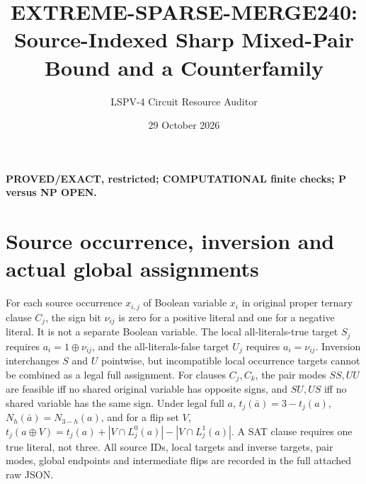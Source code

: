 \documentclass{article}
\title{EXTREME-SPARSE-MERGE240: Source-Indexed Sharp Mixed-Pair Bound and a Counterfamily}
\author{LSPV-4 Circuit Resource Auditor}
\date{29 October 2026}
\begin{document}
\maketitle
\noindent\textbf{PROVED/EXACT, restricted; COMPUTATIONAL finite checks; P versus NP OPEN.}
\section{Source occurrence, inversion and actual global assignments}
For each source occurrence $x_{i,j}$ of Boolean variable $x_i$ in original proper ternary clause $C_j$, the sign bit $\nu_{ij}$ is zero for a positive literal and one for a negative literal. It is not a separate Boolean variable. The local all-literals-true target $S_j$ requires $a_i=1\oplus\nu_{ij}$, and the all-literals-false target $U_j$ requires $a_i=\nu_{ij}$. Inversion interchanges $S$ and $U$ pointwise, but incompatible local occurrence targets cannot be combined as a legal full assignment.
For clauses $C_j,C_k$, the pair modes $SS,UU$ are feasible iff no shared original variable has opposite signs, and $SU,US$ iff no shared variable has the same sign. Under legal full $a$, $t_j(\bar a)=3-t_j(a)$, $N_h(\bar a)=N_{3-h}(a)$, and for a flip set $V$, $t_j(a\oplus V)=t_j(a)+|V\cap L_j^0(a)|-|V\cap L_j^1(a)|$. A SAT clause requires one true literal, not three. All source IDs, local targets and inverse targets, pair modes, global endpoints and intermediate flips are recorded in the full attached raw JSON.
\end{document}
